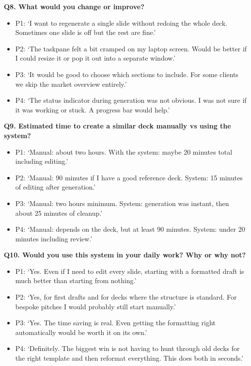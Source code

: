 \textbf{Q8. What would you change or improve?}

\begin{itemize}
    \item P1: `I want to regenerate a single slide without redoing the whole deck. Sometimes one slide is off but the rest are fine.'
    \item P2: `The taskpane felt a bit cramped on my laptop screen. Would be better if I could resize it or pop it out into a separate window.'
    \item P3: `It would be good to choose which sections to include. For some clients we skip the market overview entirely.'
    \item P4: `The status indicator during generation was not obvious. I was not sure if it was working or stuck. A progress bar would help.'
\end{itemize}

\textbf{Q9. Estimated time to create a similar deck manually vs using the system?}

\begin{itemize}
    \item P1: `Manual: about two hours. With the system: maybe 20 minutes total including editing.'
    \item P2: `Manual: 90 minutes if I have a good reference deck. System: 15 minutes of editing after generation.'
    \item P3: `Manual: two hours minimum. System: generation was instant, then about 25 minutes of cleanup.'
    \item P4: `Manual: depends on the deck, but at least 90 minutes. System: under 20 minutes including review.'
\end{itemize}

\textbf{Q10. Would you use this system in your daily work? Why or why not?}

\begin{itemize}
    \item P1: `Yes. Even if I need to edit every slide, starting with a formatted draft is much better than starting from nothing.'
    \item P2: `Yes, for first drafts and for decks where the structure is standard. For bespoke pitches I would probably still start manually.'
    \item P3: `Yes. The time saving is real. Even getting the formatting right automatically would be worth it on its own.'
    \item P4: `Definitely. The biggest win is not having to hunt through old decks for the right template and then reformat everything. This does both in seconds.'
\end{itemize}

